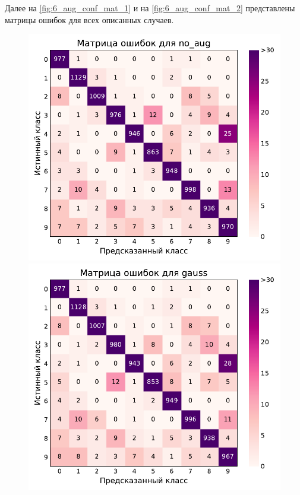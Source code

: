 \documentclass[12pt]{article}
\begin{document}
Далее на \autoref{fig:6_aug_conf_mat_1} и на \autoref{fig:6_aug_conf_mat_2} представлены матрицы ошибок для всех описанных случаев.
\begin{figure}[!h]
    \includegraphics[scale=0.6]{6_aug_conf_mat_no_aug.pdf}
    \includegraphics[scale=0.6]{6_aug_conf_mat_gauss.pdf}

\end{figure}
\end{document}
